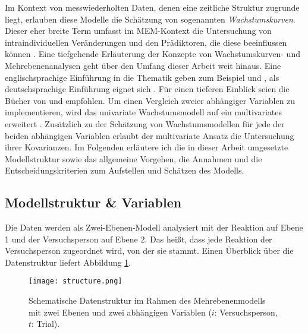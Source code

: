 		Im Kontext von messwiederholten Daten, denen eine zeitliche Struktur zugrunde liegt, erlauben diese Modelle die Schätzung von sogenannten \textit{Wachstumskurven}. Dieser eher breite Term umfasst im MEM-Kontext die Untersuchung von intraindividuellen Veränderungen und den Prädiktoren, die diese beeinflussen können \parencite{CURRAN2010}.
		Eine tiefgehende Erläuterung der Konzepte von Wachstumskurven- und Mehrebenenanalysen geht über den Umfang dieser Arbeit weit hinaus. Eine englischsprachige Einführung in die Thematik geben zum Beispiel \textcite{BAGIELLA2000, NEZLEK2012} und \textcite{PAGEGOULD2016}, als deutschsprachige Einführung eignet sich \textcite{NEZLEK2006}. Für einen tieferen Einblick seien die Bücher von \textcite{GRIMM2017, BICKEL2007} und \textcite{RAUDENBUSH2002} empfohlen. 
		Um einen Vergleich zweier abhängiger Variablen zu implementieren, wird das univariate Wachstumsmodell auf ein multivariates erweitert \parencite[nach dem Vorbild von][]{CURRAN2012, MACCALLUM1997}. 
		Zusätzlich zu der Schätzung von Wachstumsmodellen für jede der beiden abhängigen Variablen erlaubt der multivariate Ansatz die Untersuchung ihrer Kovarianzen. 
		Im Folgenden erläutere ich die in dieser Arbeit umgesetzte Modellstruktur sowie das allgemeine Vorgehen, die Annahmen und die Entscheidungskriterien zum Aufstellen und Schätzen des Modells.
		

	\subsection{Modellstruktur \& Variablen}
		
		Die Daten werden als Zwei-Ebenen-Modell analysiert mit der Reaktion auf Ebene 1 und der Versuchsperson auf Ebene 2. Das heißt, dass jede Reaktion der Versuchsperson zugeordnet wird, von der sie stammt. 
		Einen Überblick über die Datenstruktur liefert Abbildung \ref{fig:struktur}.
		
		\begin{figure}[h]
			\begin{center}
				\texttt{[image: structure.png]}
				\caption[Schematische Datenstruktur im Rahmen des Mehrebenenmodells]
				{Schematische Datenstruktur im Rahmen des Mehrebenenmodells mit zwei Ebenen und zwei abhängigen Variablen ($i$: Versuchsperson, $t$: Trial).}
				\label{fig:struktur}
		\end{center}\end{figure}

